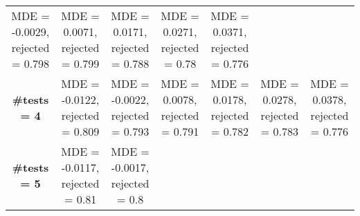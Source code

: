\documentclass[
]{article}
\begin{document}
\begin{longtable}[]{@{}ccccccc@{}}
\begin{minipage}[t]{0.12\columnwidth}
MDE = -0.0029, rejected = 0.798\strut
\end{minipage} & \begin{minipage}[t]{0.12\columnwidth}\centering
MDE = 0.0071, rejected = 0.799\strut
\end{minipage} & \begin{minipage}[t]{0.12\columnwidth}\centering
MDE = 0.0171, rejected = 0.788\strut
\end{minipage} & \begin{minipage}[t]{0.12\columnwidth}\centering
MDE = 0.0271, rejected = 0.78\strut
\end{minipage} & \begin{minipage}[t]{0.12\columnwidth}\centering
MDE = 0.0371, rejected = 0.776\strut
\end{minipage}\tabularnewline
\begin{minipage}[t]{0.06\columnwidth}\centering
\textbf{\#tests = 4}\strut
\end{minipage} & \begin{minipage}[t]{0.12\columnwidth}\centering
MDE = -0.0122, rejected = 0.809\strut
\end{minipage} & \begin{minipage}[t]{0.12\columnwidth}\centering
MDE = -0.0022, rejected = 0.793\strut
\end{minipage} & \begin{minipage}[t]{0.12\columnwidth}\centering
MDE = 0.0078, rejected = 0.791\strut
\end{minipage} & \begin{minipage}[t]{0.12\columnwidth}\centering
MDE = 0.0178, rejected = 0.782\strut
\end{minipage} & \begin{minipage}[t]{0.12\columnwidth}\centering
MDE = 0.0278, rejected = 0.783\strut
\end{minipage} & \begin{minipage}[t]{0.12\columnwidth}\centering
MDE = 0.0378, rejected = 0.776\strut
\end{minipage}\tabularnewline
\begin{minipage}[t]{0.06\columnwidth}\centering
\textbf{\#tests = 5}\strut
\end{minipage} & \begin{minipage}[t]{0.12\columnwidth}\centering
MDE = -0.0117, rejected = 0.81\strut
\end{minipage} & \begin{minipage}[t]{0.12\columnwidth}\centering
MDE = -0.0017, rejected = 0.8\strut
\end{minipage} & \begin{minipage}[t]{0.12\columnwidth}\centering

\end{minipage}
\end{longtable}
\end{document}

